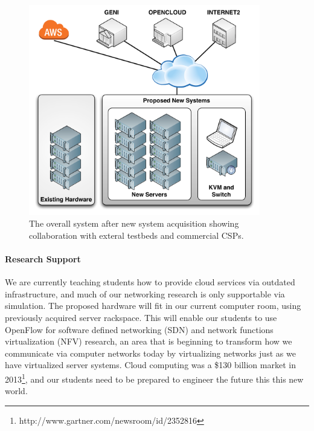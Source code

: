 \documentclass[12pt,letterpaper]{article}
\begin{document}
\begin{figure}[!t]
\centering
\includegraphics[width=0.9\textwidth]{images/system.pdf}
\caption{The overall system after new system acquisition showing collaboration with exteral testbeds and commercial CSPs.}
\label{fig:conops}
\end{figure}

\paragraph{Research Support} We are currently teaching students how to provide cloud services via outdated infrastructure, and much of our networking research is only supportable via simulation. The proposed hardware will fit in our current computer room, using previously acquired server rackspace. This will enable our students to use OpenFlow for software defined networking (SDN) and network functions virtualization (NFV) research, an area that is beginning to transform how we communicate via computer networks today by virtualizing networks just as we have virtualized server systems. Cloud computing was a \$130 billion market in 2013\footnote{http://www.gartner.com/newsroom/id/2352816}, and our students need to be prepared to engineer the future this this new world.
\end{document}
